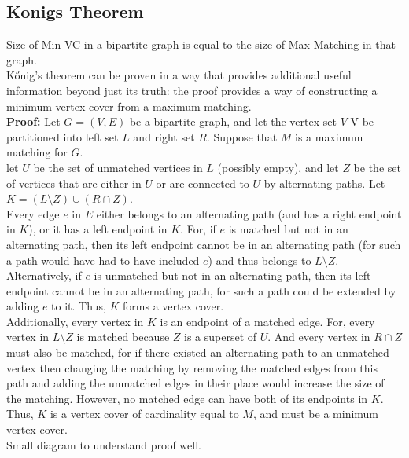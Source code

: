 \documentclass[8pt, a4paper, oneside, twocolumn]{extarticle}
\begin{document}
\subsection{Konigs Theorem}
Size of Min VC in a bipartite graph is equal to the size of Max Matching in that graph.
\\Kőnig's theorem can be proven in a way that provides additional useful information beyond just its truth: the proof provides a way of constructing a minimum vertex cover from a maximum matching.
\\\textbf{Proof: } Let $G = (V, E)$ be a bipartite graph, and let the vertex set $V$ V be partitioned into left set $L$ and right set $R$. Suppose that $M$ is a maximum matching for $G$.
\\let $U$ be the set of unmatched vertices in $L$ (possibly empty), and let $Z$ be the set of vertices that are either in $U$ or are connected to $U$ by alternating paths. Let $K = ( L \setminus Z ) \cup ( R \cap Z )$. 
\\Every edge $e$ in $E$ either belongs to an alternating path (and has a right endpoint in $K$), or it has a left endpoint in $K$. For, if $e$ is matched but not in an alternating path, then its left endpoint cannot be in an alternating path (for such a path would have had to have included $e$) and thus belongs to $L \setminus Z$. Alternatively, if $e$ is unmatched but not in an alternating path, then its left endpoint cannot be in an alternating path, for such a path could be extended by adding $e$ to it. Thus, $K$ forms a vertex cover.\\
Additionally, every vertex in $K$ is an endpoint of a matched edge. For, every vertex in $L \setminus Z$ is matched because $Z$ is a superset of $U$. And every vertex in $R \cap Z$ must also be matched, for if there existed an alternating path to an unmatched vertex then changing the matching by removing the matched edges from this path and adding the unmatched edges in their place would increase the size of the matching. However, no matched edge can have both of its endpoints in $K$. Thus, $K$ is a vertex cover of cardinality equal to $M$, and must be a minimum vertex cover.
\\Small diagram to understand proof well.
\end{document}
